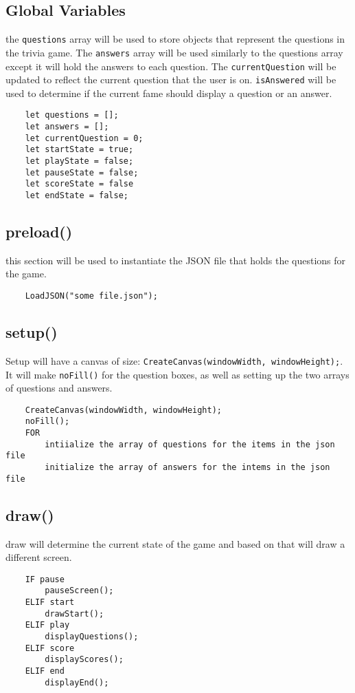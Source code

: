 \documentclass[12 pt]{report}
\begin{document}
\subsection{Global Variables} 
 the \verb|questions| array will be used to store objects that represent the questions in the trivia game. The \verb|answers| array will be used similarly to the questions array except it will hold the answers to each question. The \verb|currentQuestion| will be updated to reflect the current question that the user is on. \verb|isAnswered| will be used to determine if the current fame should display a question or an answer. 
\begin{verbatim}
    let questions = [];
    let answers = [];
    let currentQuestion = 0;
    let startState = true;
    let playState = false;
    let pauseState = false;
    let scoreState = false
    let endState = false;
\end{verbatim}

\subsection{preload()}
this section will be used to instantiate the JSON file that holds the questions for the game.
\begin{verbatim}
    LoadJSON("some file.json");
\end{verbatim}

\subsection{setup()} 
Setup will have a canvas of size: \verb|CreateCanvas(windowWidth, windowHeight);|. It will make \verb|noFill()| for the question boxes, as well as setting up the two arrays of questions and answers.
\begin{verbatim}
    CreateCanvas(windowWidth, windowHeight);
    noFill();
    FOR 
        intiialize the array of questions for the items in the json file
        initialize the array of answers for the intems in the json file
\end{verbatim}


\subsection{draw()}
draw will determine the current state of the game and based on that will draw a different screen.
\begin{verbatim}
    IF pause
        pauseScreen();
    ELIF start
        drawStart();
    ELIF play
        displayQuestions();
    ELIF score
        displayScores();
    ELIF end
        displayEnd();
\end{verbatim}
\end{document}
